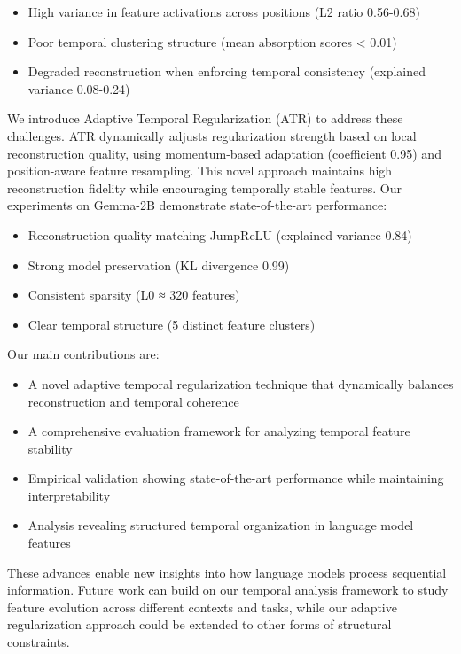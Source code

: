 \documentclass{article} %
\begin{document}
\begin{itemize}
    \item High variance in feature activations across positions (L2 ratio 0.56-0.68)
    \item Poor temporal clustering structure (mean absorption scores < 0.01)
    \item Degraded reconstruction when enforcing temporal consistency (explained variance 0.08-0.24)
\end{itemize}

We introduce Adaptive Temporal Regularization (ATR) to address these challenges. ATR dynamically adjusts regularization strength based on local reconstruction quality, using momentum-based adaptation (coefficient 0.95) and position-aware feature resampling. This novel approach maintains high reconstruction fidelity while encouraging temporally stable features. Our experiments on Gemma-2B demonstrate state-of-the-art performance:

\begin{itemize}
    \item Reconstruction quality matching JumpReLU (explained variance 0.84)
    \item Strong model preservation (KL divergence 0.99)
    \item Consistent sparsity (L0 ≈ 320 features)
    \item Clear temporal structure (5 distinct feature clusters)
\end{itemize}

Our main contributions are:

\begin{itemize}
    \item A novel adaptive temporal regularization technique that dynamically balances reconstruction and temporal coherence
    \item A comprehensive evaluation framework for analyzing temporal feature stability
    \item Empirical validation showing state-of-the-art performance while maintaining interpretability
    \item Analysis revealing structured temporal organization in language model features
\end{itemize}

These advances enable new insights into how language models process sequential information. Future work can build on our temporal analysis framework to study feature evolution across different contexts and tasks, while our adaptive regularization approach could be extended to other forms of structural constraints.
\end{document}
